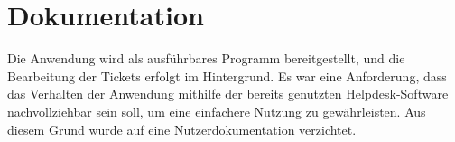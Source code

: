 \section{Dokumentation}
\label{sec:Dokumentation}
Die Anwendung wird als ausführbares Programm bereitgestellt, und die Bearbeitung der 
Tickets erfolgt im Hintergrund. Es war eine Anforderung, dass das Verhalten der 
Anwendung mithilfe der bereits genutzten Helpdesk-Software nachvollziehbar sein 
soll, um eine einfachere Nutzung zu gewährleisten. Aus diesem Grund wurde auf 
eine Nutzerdokumentation verzichtet.
